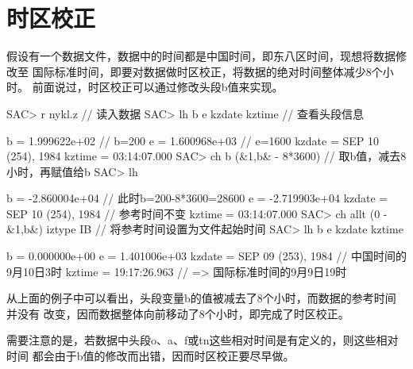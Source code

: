 \section{时区校正}
\label{sec:time-zone-correction}
假设有一个数据文件，数据中的时间都是中国时间，即东八区时间，现想将数据修改至
国际标准时间，即要对数据做时区校正，将数据的绝对时间整体减少8个小时。
前面说过，时区校正可以通过修改头段b值来实现。

\begin{SACCode}
SAC> r nykl.z                           // 读入数据
SAC> lh b e kzdate kztime               // 查看头段信息

          b = 1.999622e+02              // b=200
          e = 1.600968e+03              // e=1600
     kzdate = SEP 10 (254), 1984
     kztime = 03:14:07.000
SAC> ch b (&1,b& - 8*3600)              // 取b值，减去8小时，再赋值给b
SAC> lh

          b = -2.860004e+04             // 此时b=200-8*3600=28600
          e = -2.719903e+04
     kzdate = SEP 10 (254), 1984        // 参考时间不变
     kztime = 03:14:07.000
SAC> ch allt (0 - &1,b&) iztype IB      // 将参考时间设置为文件起始时间
SAC> lh b e kzdate kztime

          b = 0.000000e+00
          e = 1.401006e+03
     kzdate = SEP 09 (253), 1984        // 中国时间的9月10日3时
     kztime = 19:17:26.963              // => 国际标准时间的9月9日19时
\end{SACCode}

从上面的例子中可以看出，头段变量b的值被减去了8个小时，而数据的参考时间并没有
改变，因而数据整体向前移动了8个小时，即完成了时区校正。

需要注意的是，若数据中头段o、a、f或tn这些相对时间是有定义的，则这些相对时间
都会由于b值的修改而出错，因而时区校正要尽早做。
